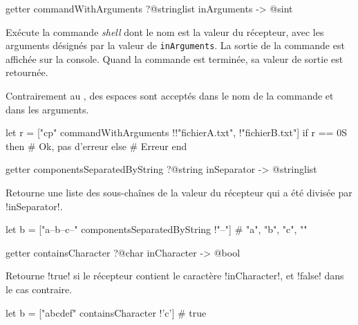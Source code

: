 
\begin{galgasbox}
getter commandWithArguments ?@stringlist inArguments -> @sint
\end{galgasbox}
Exécute la commande \emph{shell} dont le nom est la valeur du récepteur, avec les arguments désignés par la valeur de \texttt{inArguments}. La sortie de la commande est affichée sur la console. Quand la commande est terminée, sa valeur de sortie est retournée.

Contrairement au , des espaces sont acceptés dans le nom de la commande et dans les arguments.

\begin{galgas}
let r = ["cp" commandWithArguments !{!"fichierA.txt", !"fichierB.txt"}]
if r == 0S then
  # Ok, pas d'erreur
else
  # Erreur
end
\end{galgas}
















\begin{galgasbox}
getter componentsSeparatedByString ?@string inSeparator -> @stringlist
\end{galgasbox}
Retourne une liste des sous-chaînes de la valeur du récepteur qui a été divisée par \ggs!inSeparator!.

\begin{galgas}
let b = ["a--b--c--" componentsSeparatedByString !"--"]
# "a", "b", "c", ""
\end{galgas}













\begin{galgasbox}
getter containsCharacter ?@char inCharacter -> @bool
\end{galgasbox}
Retourne \ggs!true! si le récepteur contient le caractère \ggs!inCharacter!, et \ggs!false! dans le cas contraire.

\begin{galgas}
let b = ["abcdef" containsCharacter !'c'] # true
\end{galgas}






